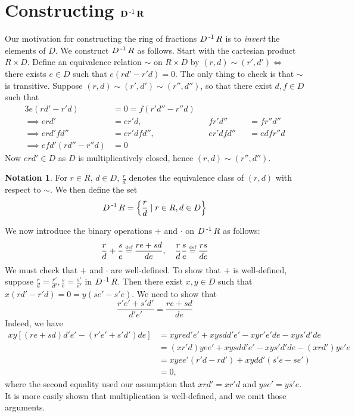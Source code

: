 \documentclass[11pt]{book}
\newcounter{counter}
\theoremstyle{definition}   \newtheorem{defn}[counter]{Definition} %
\newtheorem*{notation*}{Notation}   \newtheorem{example}[counter]{Example(s)}   \newtheorem*{example*}{Example(s)}   \newtheorem*{warning}{Warning} \newtheorem*{corollary*}{Corollary}
\newcommand\myeq{\mathrel{\overset{\makebox[0pt]{\mbox{\normalfont\tiny\sffamily \textrm{def}}}}{=}}}
\newcommand{\vs}{\vspace{8pt}}
\numberwithin{counter}{chapter}
\begin{document}
\vs

\section*{Constructing $\mathbf{D\operatorname{^{-1}} R}$}

\vs

Our motivation for constructing the ring of fractions $D\operatorname{^{-1}} R$ is to \emph{invert} the elements of $D$. We construct $D\operatorname{^{-1}} R$ as follows. Start with the cartesian product $R \times D$. Define an equivalence relation $\sim$ on $R \times D$ by $(r,d) \sim (r',d') \iff $ there exists $e \in D$ such that $e(rd' - r'd) = 0$. The only thing to check is that $\sim$ is transitive. Suppose $(r,d) \sim (r',d') \sim (r'',d'')$, so that there exist $d,f \in D$ such that
\begin{alignat*}{3}
e(rd'-r'd) &= 0 = f(r'd''-r''d) && && \\
\implies erd' &= er'd, \qquad && fr'd'' &&= fr''d'' \\
\implies erd'fd'' &= er'dfd'', \qquad && er'dfd'' &&= edfr''d \tag{multiply by $fd''$} \\
\implies efd'(rd''-r''d) &= 0 && &&
\end{alignat*}
Now $erd' \in D$ as $D$ is multiplicatively closed, hence $(r,d) \sim (r'',d'')$.

\vs

\begin{notation*}
For $r \in R$, $d \in D$, $\frac{r}{d}$ denotes the equivalence class of $(r,d)$ with respect to $\sim$. We then define the set
	\[D\operatorname{^{-1}} R = \left\{ \frac{r}{d} \mid r \in R, d \in D \right\} \]
\end{notation*}

\vs

We now introduce the binary operations $+$ and $\cdot$ on $D\operatorname{^{-1}} R$ as follows:
	\[\frac{r}{d} + \frac{s}{e} \myeq \frac{re+sd}{de}, \quad \frac{r}{d}\frac{s}{e} \myeq \frac{rs}{de} \]
We must check that $+$ and $\cdot$ are well-defined. To show that $+$ is well-defined, suppose $\frac{r}{d} = \frac{r'}{d'}, \frac{s}{e} = \frac{s'}{e'}$ in $D\operatorname{^{-1}} R$. Then there exist $x,y \in D$ such that $x(rd'-r'd) = 0 = y(se'-s'e)$. We need to show that
	\[\frac{r'e'+s'd'}{d'e'} = \frac{re+sd}{de} \]
Indeed, we have
\begin{align*}
xy[(re+sd)d'e' - (r'e'+s'd')de] &= xyred'e' + xysdd'e' - xyr'e'de - xys'd'de \\
&= (xr'd)yee' + xysdd'e' - xys'd'de - (xrd')ye'e \\
&= xyee'(r'd-rd') + xydd'(s'e-se') \\
&= 0,
\end{align*}
where the second equality used our assumption that $xrd' = xr'd$ and $yse' = ys'e$. It is more easily shown that multiplication is well-defined, and we omit those arguments. \\
\end{document}

